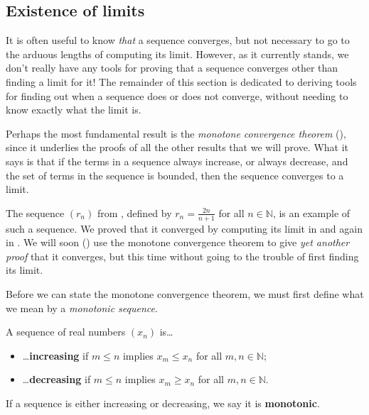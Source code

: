 \subsection*{Existence of limits}

It is often useful to know \textit{that} a sequence converges, but not necessary to go to the arduous lengths of computing its limit. However, as it currently stands, we don't really have any tools for proving that a sequence converges other than finding a limit for it! The remainder of this section is dedicated to deriving tools for finding out when a sequence does or does not converge, without needing to know exactly what the limit is.

Perhaps the most fundamental result is the \textit{monotone convergence theorem} (), since it underlies the proofs of all the other results that we will prove. What it says is that if the terms in a sequence always increase, or always decrease, and the set of terms in the sequence is bounded, then the sequence converges to a limit.

The sequence $(r_n)$ from , defined by $r_n=\frac{2n}{n+1}$ for all $n \in \mathbb{N}$, is an example of such a sequence. We proved that it converged by computing its limit in  and again in . We will soon () use the monotone convergence theorem to give \textit{yet another proof} that it converges, but this time without going to the trouble of first finding its limit.

Before we can state the monotone convergence theorem, we must first define what we mean by a \textit{monotonic sequence}.

\begin{definition}
\label{defMonotoneSequence}
A sequence of real numbers $(x_n)$ is\dots{}
\begin{itemize}
\item \dots{}\textbf{increasing} if $m \le n$ implies $x_m \le x_n$ for all $m,n \in \mathbb{N}$;
\item \dots{}\textbf{decreasing} if $m \le n$ implies $x_m \ge x_n$ for all $m,n \in \mathbb{N}$.
\end{itemize}
If a sequence is either increasing or decreasing, we say it is \textbf{monotonic}.
\end{definition}

